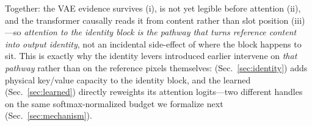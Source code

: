 \begin{table}[t]\centering\small
\setlength{\tabcolsep}{4pt}
\caption[Content-vs-position causal swap]{\textbf{Content-vs-position causal swap} (mean AdaFace cosine over
detected faces; only the identity-slot pixels vary across conditions). Identity
follows reference \emph{content}, not slot position. Full table incl.\ the VAE
round-trip and token-geometry results: App.~\ref{sec:appendix_causal},
Table~\ref{tab:causalswap}.}
\label{tab:causalswap_brief}
\end{table}

\noindent Together: the VAE evidence survives (i), is not yet legible before
attention (ii), and the transformer causally reads it from content rather than
slot position (iii)---so \emph{attention to the identity block is the pathway
that turns reference content into output identity}, not an incidental
side-effect of where the block happens to sit. This is exactly why the
identity levers introduced earlier intervene on \emph{that pathway} rather
than on the reference pixels themselves: \dupid{} (Sec.~\ref{sec:identity})
adds physical key/value capacity to the identity block, and the learned
\gate{} (Sec.~\ref{sec:learned}) directly reweights its attention
logits---two different handles on the same softmax-normalized budget we
formalize next (Sec.~\ref{sec:mechanism}).

